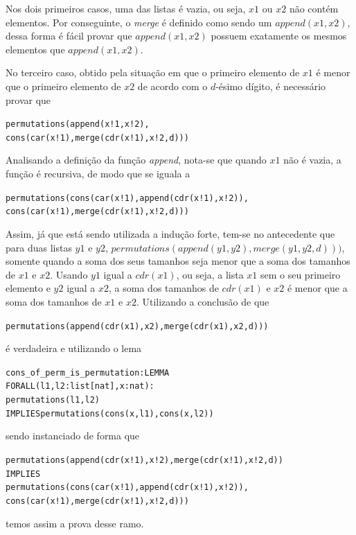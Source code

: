 \documentclass[a4paper, 12pt]{article}
\begin{document}
    Nos dois primeiros casos, uma das listas é vazia, ou seja, $x1$ ou $x2$ não contém elementos. Por conseguinte, o \textit{merge} é definido como sendo um $append(x1, x2)$, dessa forma é fácil provar que $append(x1, x2)$ possuem exatamente os mesmos elementos que $append(x1, x2)$.
    
    No terceiro caso, obtido pela situação em que o primeiro elemento de $x1$ é menor que o primeiro elemento de $x2$ de acordo com o $d$-ésimo dígito, é necessário provar que 
    \begin{alltt}
        permutations(append(x!1, x!2),
                     cons(car(x!1), merge(cdr(x!1), x!2, d)))
    \end{alltt}
    Analisando a definição da função \textit{append}, nota-se que quando $x1$ não é vazia, a função é recursiva, de modo que se iguala a 
   \begin{alltt}
        permutations(cons(car(x!1), append(cdr(x!1), x!2)),
                     cons(car(x!1),  merge(cdr(x!1), x!2, d)))
    \end{alltt}
    Assim, já que está sendo utilizada a indução forte, tem-se no antecedente que para duas listas $y1$ e $y2$, $permutations(append(y1, y2), merge(y1, y2, d)))$,
    somente quando a soma dos seus tamanhos seja menor que a soma dos tamanhos de $x1$ e $x2$. Usando $y1$ igual a $cdr(x1)$, ou seja, a lista $x1$ sem o seu primeiro elemento e $y2$ igual a $x2$, a soma dos tamanhos de $cdr(x1)$ e $x2$ é menor que a soma dos tamanhos de $x1$ e $x2$. Utilizando a conclusão de que 
   \begin{alltt}
    permutations(append(cdr(x1), x2), merge(cdr(x1), x2, d)))
    \end{alltt}
    é verdadeira e utilizando o lema 
    \begin{alltt}
     cons_of_perm_is_permutation : LEMMA
        FORALL (l1, l2:list[nat], x:nat): 
               permutations(l1, l2) 
                  IMPLIES permutations(cons(x,l1), cons(x,l2))
    \end{alltt}
    sendo instanciado de forma que
    \begin{alltt}
permutations(append(cdr(x!1), x!2), merge(cdr(x!1), x!2, d)) 
    IMPLIES 
    permutations(cons(car(x!1), append(cdr(x!1), x!2)), 
        cons(car(x!1),  merge(cdr(x!1), x!2, d)))
    \end{alltt}
    temos assim a prova desse ramo.
    
\end{document}
